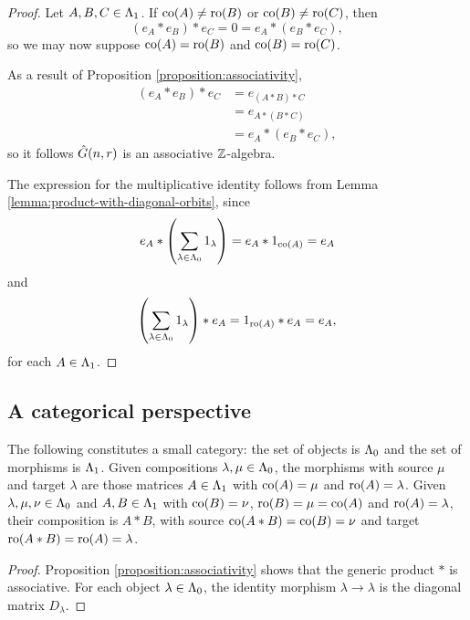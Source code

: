 \documentclass[a4paper, 11pt]{report}
\begin{document}
\begin{proof}
Let $A,B,C\in\Lambda_1{}$. If $\operatorname{co}(A)\neq\operatorname{ro}(B)$ or $\operatorname{co}(B)\neq\operatorname{ro}(C)$, then
\begin{equation*}
(e_A\ast e_B)\ast e_C = 0 = e_A\ast (e_B\ast e_C),
\end{equation*}
so we may now suppose $\operatorname{co}(A)=\operatorname{ro}(B)$ and $\operatorname{co}(B)=\operatorname{ro}(C)$.

As a result of Proposition \ref{proposition:associativity},
\begin{align*}
(e_A\ast e_B)\ast e_C &= e_{(A\ast B)\ast C}\\
&= e_{A\ast (B\ast C)}\\
&= e_A\ast (e_B\ast e_C),
\end{align*}
so it follows $\hat{G}(n,r)$ is an associative $\mathbb{Z}$-algebra.

The expression for the multiplicative identity follows from Lemma \ref{lemma:product-with-diagonal-orbits}, since
\begin{equation*}
e_A\ast \left(\sum_{\lambda\in\Lambda_0{}} 1_\lambda\right) = e_A\ast 1_{\operatorname{co}(A)} = e_A
\end{equation*}
and
\begin{equation*}
\left(\sum_{\lambda\in\Lambda_0{}} 1_\lambda\right)\ast e_A = 1_{\operatorname{ro}(A)}\ast e_A = e_A,
\end{equation*} 
for each $A\in\Lambda_1{}$.
\end{proof}

\subsection{A categorical perspective}

\begin{proposition}\label{prop:generic-category}
The following constitutes a small category: the set of objects is $\Lambda_0{}$ and the set of morphisms is $\Lambda_1{}$. Given compositions $\lambda,\mu\in\Lambda_0{}$, the morphisms with source $\mu$ and target $\lambda$ are those matrices $A\in\Lambda_1{}$ with $\operatorname{co}(A)=\mu$ and $\operatorname{ro}(A)=\lambda$. Given $\lambda,\mu,\nu\in\Lambda_0{}$ and $A,B\in\Lambda_1{}$ with $\operatorname{co}(B)=\nu$, $\operatorname{ro}(B)=\mu=\operatorname{co}(A)$ and $\operatorname{ro}(A)=\lambda$, their composition is $A\ast B$, with source $\operatorname{co}(A\ast B)=\operatorname{co}(B)=\nu$ and target $\operatorname{ro}(A\ast B)=\operatorname{ro}(A)=\lambda$.
\end{proposition}

\begin{proof}
Proposition \ref{proposition:associativity} shows that the generic product $\ast$ is associative. For each object $\lambda\in\Lambda_0{}$, the identity morphism $\lambda\to\lambda$ is the diagonal matrix $D_\lambda$.
\end{proof}
\end{document}
